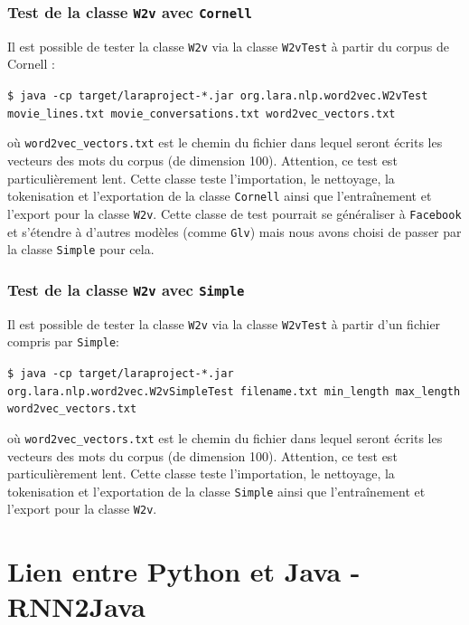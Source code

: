 \documentclass[10pt,a4paper]{article}
\begin{document}
\subsubsection{Test de la classe \texttt{W2v} avec \texttt{Cornell}}
Il est possible de tester la classe \texttt{W2v} via la classe \texttt{W2vTest} à partir du corpus de Cornell :
\begin{center}
	\texttt{\$ java -cp target/laraproject-*.jar org.lara.nlp.word2vec.W2vTest movie\_lines.txt movie\_conversations.txt word2vec\_vectors.txt}
\end{center}
où \texttt{word2vec\_vectors.txt} est le chemin du fichier dans lequel seront écrits les vecteurs des mots du corpus (de dimension 100). Attention, ce test est particulièrement lent. Cette classe teste l'importation, le nettoyage, la tokenisation et l'exportation de la classe \texttt{Cornell} ainsi que l'entraînement et l'export pour la classe \texttt{W2v}. Cette classe de test pourrait se généraliser à \texttt{Facebook} et s'étendre à d'autres modèles (comme \texttt{Glv}) mais nous avons  choisi de passer par la classe \texttt{Simple} pour cela.
\subsubsection{Test de la classe \texttt{W2v} avec \texttt{Simple}}
Il est possible de tester la classe \texttt{W2v} via la classe \texttt{W2vTest} à partir d'un fichier compris par \texttt{Simple}:
\begin{center}
	\texttt{\$ java -cp target/laraproject-*.jar org.lara.nlp.word2vec.W2vSimpleTest filename.txt min\_length max\_length word2vec\_vectors.txt}
\end{center}
où \texttt{word2vec\_vectors.txt} est le chemin du fichier dans lequel seront écrits les vecteurs des mots du corpus (de dimension 100). Attention, ce test est particulièrement lent. Cette classe teste l'importation, le nettoyage, la tokenisation et l'exportation de la classe \texttt{Simple} ainsi que l'entraînement et l'export pour la classe \texttt{W2v}.


\section{Lien entre Python et Java - RNN2Java}
\end{document}
